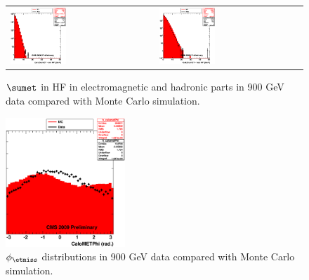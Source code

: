 \begin{figure}[h!]
 \centering
 \begin{tabular}{ll}
  \includegraphics[width=0.40\textwidth]{plots_DataVsMC_MB_900GeV/h_caloSumetEmHF.eps} &
  \includegraphics[width=0.40\textwidth]{plots_DataVsMC_MB_900GeV/h_caloSumetHadHF.eps} \\
 \end{tabular}
 \caption{$\sumet$ in HF in electromagnetic and hadronic parts in 900 GeV data compared
   with Monte Carlo simulation.
          \label{fig:DataVsMC_MB_900_6}}
\end{figure}

\begin{figure}[h!]
 \centering
  \includegraphics[width=0.40\textwidth]{plots_DataVsMC_MB_900GeV/h_calometPhi.eps}
 \caption{$\phi_{\etmiss}$ distributions in 900 GeV data compared
   with Monte Carlo simulation.
          \label{fig:DataVsMC_MB_900_7}}
\end{figure}

